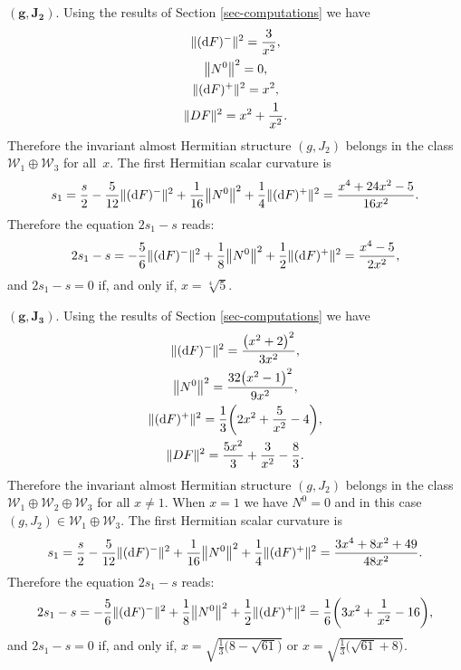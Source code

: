\documentclass[10pt,a4paper]{amsart}
\numberwithin{equation}{section}
\begin{document}
\medskip\noindent
$\boldsymbol{(g,J_2).}$ Using the results of Section \ref{sec-computations} we have
\begin{gather*}
\|({\rm d}F)^{-}\|^{2}=\dfrac{3}{x^2}, \\
 \big\|N^{0}\big\|^{2}=0, \\
\|({\rm d}F)^{+}\|^{2}=x^{2}, \\
\|DF\|^{2}=x^2+\frac{1}{x^2}.
\end{gather*}
Therefore the invariant almost Hermitian structure $(g,J_2)$ belongs in the class $\mathcal{W}_{1}\oplus \mathcal{W}_{3}$ for all~$x$.
The first Hermitian scalar curvature is
\begin{align*}
s_{1}=\dfrac{s}{2}-\dfrac{5}{12}\|({\rm d}F)^{-}\|^{2}+\dfrac{1}{16}\big\|N^{0}\big\|^{2}+\dfrac{1}{4}\|({\rm d}F)^{+}\|^{2}
=\frac{x^4+24 x^2-5}{16 x^2}.
\end{align*}
Therefore the equation $2s_{1}-s$ reads:
\begin{align*}
2s_{1}-s=-\dfrac{5}{6}\|({\rm d}F)^{-}\|^{2}+\dfrac{1}{8}\big\|N^{0}\big\|^{2}+\dfrac{1}{2}\|({\rm d}F)^{+}\|^{2}
=\frac{x^4-5}{2 x^2},
\end{align*}
and $2s_{1}-s=0$ if, and only if, $x=\sqrt[4]{5}$.

\medskip\noindent
$\boldsymbol{(g,J_{3}).}$ Using the results of Section \ref{sec-computations} we have
\begin{gather*}
\|({\rm d}F)^{-}\|^{2}=\frac{\big(x^2+2\big)^2}{3 x^2}, \\
\big\|N^{0}\big\|^{2}=\frac{32 \big(x^2-1\big)^2}{9 x^2}, \\
\|({\rm d}F)^{+}\|^{2}=\frac{1}{3} \bigg(2 x^2+\frac{5}{x^2}-4\bigg), \\
\|DF\|^{2}=\frac{5 x^2}{3}+\frac{3}{x^2}-\frac{8}{3}.
\end{gather*}
Therefore the invariant almost Hermitian structure $(g,J_2)$ belongs in the class $\mathcal{W}_{1}\oplus \mathcal{W}_{2}\oplus \mathcal{W}_{3}$ for all $x\neq 1$. When $x=1$ we have $N^0=0$ and in this case $(g,J_2)\in \mathcal{W}_{1}\oplus \mathcal{W}_{3} $.
The first Hermitian scalar curvature is
\begin{align*}
s_{1}=\dfrac{s}{2}-\dfrac{5}{12}\|({\rm d}F)^{-}\|^{2}+\dfrac{1}{16}\big\|N^{0}\big\|^{2}+\dfrac{1}{4}\|({\rm d}F)^{+}\|^{2}
=\frac{3 x^4+8 x^2+49}{48 x^2}.
\end{align*}
Therefore the equation $2s_{1}-s$ reads:
\begin{align*}
2s_{1}-s=-\dfrac{5}{6}\|({\rm d}F)^{-}\|^{2}+\dfrac{1}{8}\big\|N^{0}\big\|^{2}+\dfrac{1}{2}\|({\rm d}F)^{+}\|^{2}
=\frac{1}{6} \bigg(3 x^2+\frac{1}{x^2}-16\bigg),
\end{align*}
and $2s_{1}-s=0$ if, and only if, $x=\sqrt{\frac{1}{3} \big(8-\sqrt{61}\big)}$ or $x=\sqrt{\frac{1}{3} \big(\sqrt{61}+8\big)}$.
\end{document}
